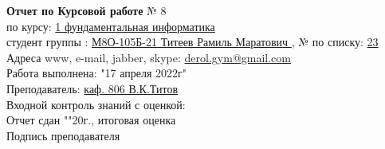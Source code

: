 \documentclass[10pt]{report}
\begin{document}
    \begin{spacing}{1.7}
        \hspace{1.2in}
        \textbf {Отчет по Курсовой работе} № 8\\     %
        \indent \hspace{1.2in} по курсу: \underline{1 фундаментальная информатика } \\
        \indent \hspace{1.2in} студент группы : \underline{М8О-105Б-21 Титеев Рамиль Маратович }, № по списку: \underline{ 23 } \\
        \indent \hspace{1.2in} Адреса www, e-mail, jabber, skype: \underline{ derol.gym@gmail.com } \\
        \indent \hspace{1.2in} Работа выполнена: "17 апреля 2022г" \\   %
        \indent \hspace{1.2in} Преподаватель: \underline{ каф. 806 В.К.Титов} \\
        \indent \hspace{1.2in} Входной контроль знаний с оценкой: \tlinee{2in} \\
        \indent \hspace{1.2in} Отчет сдан "\tlinee{0.2in}"\tlinee{1in}20\tlinee{0.2in}г., итоговая оценка \tlinee{1in}\\
        \indent \hspace{1.2in} Подпись преподавателя \tlinee{1.2in}\\
    \end{spacing}
    
\end{document}
